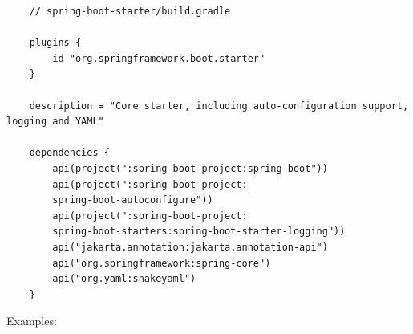 \documentclass{scrartcl}
\begin{document}
\begin{lstlisting}
    // spring-boot-starter/build.gradle

    plugins {
        id "org.springframework.boot.starter"
    }

    description = "Core starter, including auto-configuration support, logging and YAML"

    dependencies {
        api(project(":spring-boot-project:spring-boot"))
        api(project(":spring-boot-project:
        spring-boot-autoconfigure"))
        api(project(":spring-boot-project:
        spring-boot-starters:spring-boot-starter-logging"))
        api("jakarta.annotation:jakarta.annotation-api")
        api("org.springframework:spring-core")
        api("org.yaml:snakeyaml")
    }
\end{lstlisting}

Examples:
\end{document}
